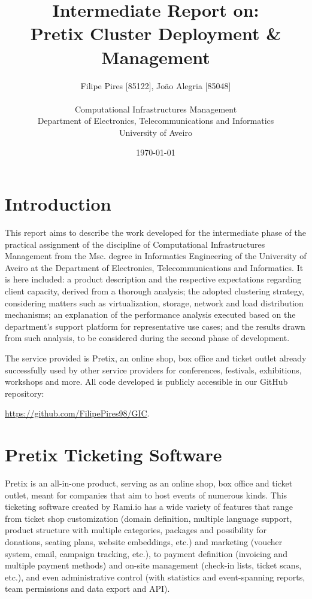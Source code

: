 \documentclass[12pt]{article}
\title{Intermediate Report on:\\Pretix Cluster Deployment \& Management}
\author
{Filipe Pires [85122], João Alegria [85048]\\
\\
Computational Infrastructures Management\\
\normalsize{Department of Electronics, Telecommunications and Informatics}\\
\normalsize{University of Aveiro}\\
}
\date{\today{}}
\begin{document}
 

\baselineskip18pt

\maketitle 

\section*{Introduction} \label{introduction} %

This report aims to describe the work developed for the intermediate phase of the practical assignment of the discipline of Computational Infrastructures 
Management \cite{assign} from the Msc. degree in Informatics Engineering of the University of Aveiro at the Department of Electronics, Telecommunications and 
Informatics.
It is here included:
a product description and the respective expectations regarding client capacity, derived from a thorough analysis;
the adopted clustering strategy, considering matters such as virtualization, storage, network and load distribution mechanisms;
an explanation of the performance analysis executed based on the department's support platform for representative use cases;
and the results drawn from such analysis, to be considered during the second phase of development.

The service provided is Pretix, an online shop, box office and ticket outlet already successfully used by other service providers for conferences, festivals, 
exhibitions, workshops and more.
All code developed is publicly accessible in our GitHub repository:

\url{https://github.com/FilipePires98/GIC}.

\newpage
\section{Pretix Ticketing Software} \label{pretix} %


Pretix \cite{pretix} is an all-in-one product, serving as an online shop, box office and ticket outlet, meant for companies that aim to host events of numerous kinds.
This ticketing software created by Rami.io \cite{rami.io} has a wide variety of features that range from ticket shop customization (domain definition, multiple 
language support, product structure with multiple categories, packages and possibility for donations, seating plans, website embeddings, etc.) and marketing 
(voucher system, email, campaign tracking, etc.), to payment definition (invoicing and multiple payment methods) and on-site management (check-in lists, ticket 
scans, etc.), and even administrative control (with statistics and event-spanning reports, team permissions and data export and API).
\end{document}
